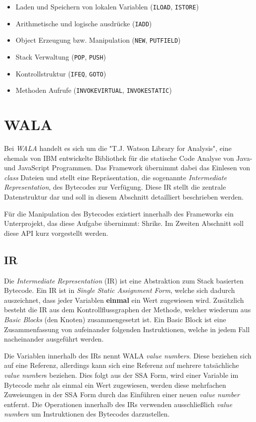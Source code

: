 \begin{itemize}
	\item Laden und Speichern von lokalen Variablen (\texttt{ILOAD}, \texttt{ISTORE})
	\item Arithmetische und logische ausdrücke (\texttt{IADD})
	\item Object Erzeugung bzw. Manipulation (\texttt{NEW}, \texttt{PUTFIELD})
	\item Stack Verwaltung (\texttt{POP}, \texttt{PUSH}) 
	\item Kontrollstruktur (\texttt{IFEQ}, \texttt{GOTO})
	\item Methoden Aufrufe (\texttt{INVOKEVIRTUAL}, \texttt{INVOKESTATIC})
\end{itemize}  


\section{WALA}

Bei \textit{WALA} \cite{wala} handelt es sich um die "T.J. Watson Library for Analysis", eine ehemals von IBM 
entwickelte Bibliothek für die statische Code Analyse von Java- und JavaScript Programmen. Das Framework 
übernimmt dabei das Einlesen von \textit{class} Dateien und stellt eine Repräsentation, die sogenannte 
\textit{Intermediate Representation}, des Bytecodes zur Verfügung. Diese IR stellt die zentrale 
Datenstruktur dar und soll in diesem Abschnitt detailliert beschrieben werden.

Für die Manipulation des Bytecodes existiert innerhalb des Frameworks ein Unterprojekt, das diese Aufgabe 
übernimmt: Shrike. Im Zweiten Abschnitt soll diese API kurz vorgestellt werden.  

\subsection{IR}

Die \textit{Intermediate Representation} (IR) ist eine Abstraktion zum Stack basierten Bytecode. Ein IR ist
in \textit{Single Static Assignment Form}, welche sich dadurch auszeichnet, dass jeder Variablen 
\textbf{einmal} ein Wert zugewiesen wird. Zusätzlich besteht die IR aus dem Kontrollflussgraphen der 
Methode, welcher wiederum aus \textit{Basic Blocks} (den Knoten) zusammengesetzt ist. Ein Basic Block ist eine 
Zusammenfassung von aufeinander folgenden Instruktionen, welche in jedem Fall nacheinander ausgeführt werden.

Die Variablen innerhalb des IRs nennt WALA \textit{value numbers}. Diese beziehen sich auf eine 
Referenz, allerdings kann sich eine Referenz auf mehrere tatsächliche \textit{value number}s beziehen.
Dies folgt aus der SSA Form, wird einer Variable im Bytecode mehr als einmal ein Wert zugewiesen, werden 
diese mehrfachen Zuweisungen in der SSA Form durch das Einführen einer neuen \textit{value number} entfernt. 
Die Operationen innerhalb des IRs verwenden ausschließlich \textit{value number}s um Instruktionen des Bytecodes 
darzustellen.   
 
